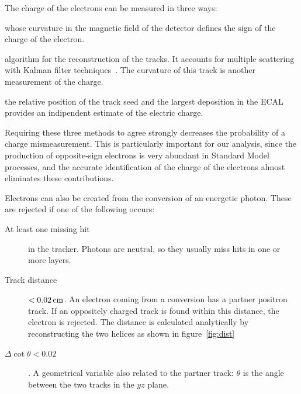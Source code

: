 The charge of the electrons can be measured in three ways:
\begin{description}\label{page:electron_charge}
    \item[The GSF track] whose curvature in the magnetic field of the
        detector defines the sign of the charge of the electron.
    \item[The CTF track] algorithm for the reconstruction of the
        tracks. It accounts for multiple scattering with Kalman filter
        techniques~\cite{springerlink:10.1140/epjc/s10052-006-0175-5}. The
        curvature of this track is another measurement of the charge.
    \item[Supercluster relative position] the relative position of the track seed
        and the largest deposition in the ECAL provides an indipendent
        estimate of the electric charge.
\end{description}
Requiring these three methods to agree strongly decreases the probability of
a charge mismeasurement. This is particularly important for our analysis,
since the production of opposite-sign electrons is very abundant in Standard
Model processes, and the accurate identification of the charge of the
electrons almost eliminates these contributions.

Electrons can also be created from the conversion of an energetic photon.
These are rejected if one of the following occurs:
\begin{description}
    \item[At least one missing hit] in the tracker. Photons are neutral, so they
        usually miss hits in one or more layers.
    \item[Track distance] $< \unit[0.02]{cm}$. An electron coming from a
        conversion has a partner positron track. If an oppositely charged
        track is found within this distance, the electron is rejected. The
        distance is calculated analytically by reconstructing the two
        helices as shown in figure~\ref{fig:dist}
    \item[$\Delta \cot \theta < 0.02$]. A geometrical variable also related
        to the partner track: $\theta$ is the angle between the two tracks
        in the $yz$ plane.
\end{description}

